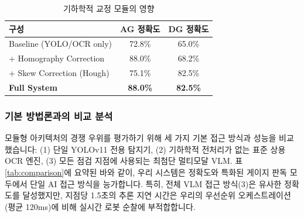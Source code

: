 \begin{table}[h]
\caption{기하학적 교정 모듈의 영향}
\label{tab:ablation}
\centering
\begin{tabular}{|l|c|c|}
\hline
\textbf{구성} & \textbf{AG 정확도} & \textbf{DG 정확도} \\
\hline
Baseline (YOLO/OCR only) & 72.8\% & 65.0\% \\
+ Homography Correction & 88.0\% & 68.2\% \\
+ Skew Correction (Hough) & 75.1\% & 82.5\% \\
\textbf{Full System} & \textbf{88.0\%} & \textbf{82.5\%} \\
\hline
\end{tabular}
\end{table}

\subsubsection{기본 방법론과의 비교 분석}
모듈형 아키텍처의 경쟁 우위를 평가하기 위해 세 가지 기본 접근 방식과 성능을 비교했습니다:
(1) 단일 YOLOv11 전용 탐지기, (2) 기하학적 전처리가 없는 표준 상용 OCR 엔진, (3) 모든 점검 지점에 사용되는 최첨단 멀티모달 VLM.
표 \ref{tab:comparison}에 요약된 바와 같이, 우리 시스템은 정확도와 특화된 게이지 판독 모두에서 단일 AI 접근 방식을 능가합니다.
특히, 전체 VLM 접근 방식(3)은 유사한 정확도를 달성했지만, 지점당 1.5초의 추론 지연 시간은 우리의 우선순위 오케스트레이션(평균 120ms)에 비해 실시간 로봇 순찰에 부적합합니다.

